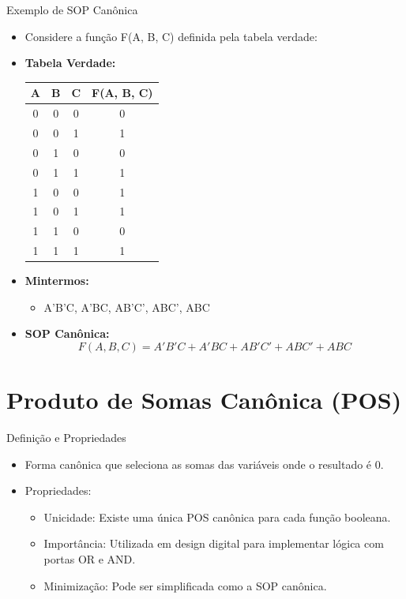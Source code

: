 \begin{frame}{Exemplo de SOP Canônica}
	\begin{itemize}
		\item Considere a função F(A, B, C) definida pela tabela verdade:
		\item \textbf{Tabela Verdade:}
		\begin{tabular}{|c|c|c|c|}
			\hline
			A & B & C & F(A, B, C) \\
			\hline
			0 & 0 & 0 & 0 \\
			0 & 0 & 1 & 1 \\
			0 & 1 & 0 & 0 \\
			0 & 1 & 1 & 1 \\
			1 & 0 & 0 & 1 \\
			1 & 0 & 1 & 1 \\
			1 & 1 & 0 & 0 \\
			1 & 1 & 1 & 1 \\
			\hline
		\end{tabular}
		\item \textbf{Mintermos:}
		\begin{itemize}
			\item A'B'C, A'BC, AB'C', ABC', ABC
		\end{itemize}
		\item \textbf{SOP Canônica:}
		\[
		F(A,B,C) = A'B'C + A'BC + AB'C' + ABC' + ABC
		\]
	\end{itemize}
\end{frame}

\section{Produto de Somas Canônica (POS)}

\begin{frame}{Definição e Propriedades}
	\begin{itemize}
		\item Forma canônica que seleciona as somas das variáveis onde o resultado é 0.
		\item Propriedades:
		\begin{itemize}
			\item Unicidade: Existe uma única POS canônica para cada função booleana.
			\item Importância: Utilizada em design digital para implementar lógica com portas OR e AND.
			\item Minimização: Pode ser simplificada como a SOP canônica.
		\end{itemize}
	\end{itemize}
\end{frame}

